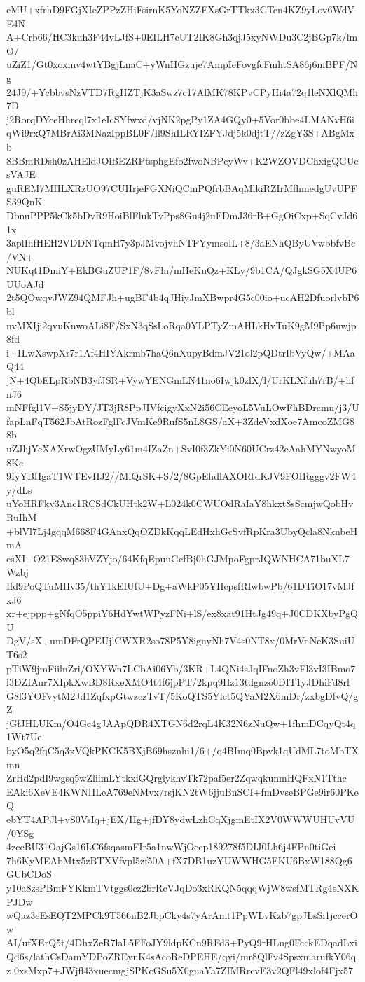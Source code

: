 cMU+xfrhD9FGjXIeZPPzZHiFsirnK5YoNZZFXsGrTTkx3CTen4KZ9yLov6WdVE4N
A+Crb66/HC3kuh3F44vLJfS+0EILH7cUT2IK8Gh3qjJ5xyNWDu3C2jBGp7k/lmO/
uZiZ1/Gt0xoxmv4wtYBgjLnaC+yWnHGzuje7AmpIeFovgfcFmhtSA86j6mBPF/Ng
24J9/+YcbbvsNzVTD7RgHZTjK3aSwz7c17AlMK78KPvCPyHi4a72q1leNXlQMh7D
j2RorqDYceHhreql7x1eIcSYfwxd/vjNK2pgPy1ZA4GQy0+5Vor0bbe4LMANvH6i
qWi9rxQ7MBrAi3MNazIppBL0F/ll9ShILRYIZFYJdj5k0djtT//zZgY3S+ABgMxb
8BBmRDsh0zAHEldJOlBEZRPtsphgEfo2fwoNBPcyWv+K2WZOVDChxigQGUesVAJE
guREM7MHLXRzUO97CUHrjeFGXNiQCmPQfrbBAqMlkiRZIrMfhmedgUvUPFS39QnK
DbnuPPP5kCk5bDvR9HoiBlFlukTvPps8Gu4j2uFDmJ36rB+GgOiCxp+SqCvJd61x
3aplIhfHEH2VDDNTqmH7y3pJMvojvhNTFYymsolL+8/3aENhQByUVwbbfvBc/VN+
NUKqt1DmiY+EkBGuZUP1F/8vFln/mHeKuQz+KLy/9b1CA/QJgkSG5X4UP6UUoAJd
2t5QOwqvJWZ94QMFJh+ugBF4b4qJHiyJmXBwpr4G5c00io+ucAH2DfuorlvbP6bl
nvMXIji2qvuKnwoALi8F/SxN3qSsLoRqa0YLPTyZmAHLkHvTuK9gM9Pp6uwjp8fd
i+1LwXswpXr7r1Af4HIYAkrmb7haQ6nXupyBdmJV21ol2pQDtrIbVyQw/+MAaQ44
jN+4QbELpRbNB3yfJSR+VywYENGmLN41no6Iwjk0zlX/l/UrKLXfuh7rB/+hfnJ6
mNFfgl1V+S5jyDY/JT3jR8PpJIVfcigyXxN2i56CEeyoL5VuLOwFhBDrcmu/j3/U
fapLnFqT562JbAtRozFglFcJVmKe9RufS5nL8GS/aX+3ZdeVxdXoe7AmcoZMG88b
uZJhjYcXAXrwOgzUMyLy61m4IZaZn+SvI0f3ZkYi0N60UCrz42cAahMYNwyoM8Kc
9IyYBHgaT1WTEvHJ2//MiQrSK+S/2/8GpEhdlAXORtdKJV9FOIRgggv2FW4y/dLs
uYoHRFkv3Anc1RCSdCkUHtk2W+L024k0CWUOdRaIaY8hkxt8sScmjwQobHvRuIhM
+blVl7Lj4gqqM668F4GAnxQqOZDkKqqLEdHxhGcSvfRpKra3UbyQcla8NknbeHmA
csXI+O21E8wq83hVZYjo/64KfqEpuuGcfBj0hGJMpoFgprJQWNHCA71buXL7Wzbj
Ifd9PoQTuMHv35/thY1kEIUfU+Dg+aWkP05YHcpsfRIwbwPb/61DTiO17vMJfxJ6
xr+ejppp+gNfqO5ppiY6HdYwtWPyzFNi+lS/ex8xat91HtJg49q+J0CDKXbyPgQU
DgV/sX+umDFrQPEUjlCWXR2so78P5Y8ignyNh7V4s0NT8x/0MrVnNeK3SuiUT6s2
pTiW9jmFiilnZri/OXYWn7LCbAi06Yb/3KR+L4QNi4sJqIFnoZh3vFl3vI3IBmo7
l3DZIAur7XIpkXwBD8RxeXMO4t4f6jpPT/2kpq9Hz13tdgnzo0DIT1yJDhiFd8rl
G8l3YOFvytM2Jd1ZqfxpGtwzczTvT/5KoQTS5Ylct5QYaM2X6mDr/zxbgDfvQ/gZ
jGfJHLUKm/O4Gc4gJAApQDR4XTGN6d2rqL4K32N6zNuQw+1fhmDCqyQt4q1Wt7Ue
byO5q2fqC5q3xVQkPKCK5BXjB69hsznhi1/6+/q4BImq0Bpvk1qUdML7toMbTXmn
ZrHd2pdI9wgsq5wZliimLYtkxiGQrglykhvTk72paf5er2ZqwqkunmHQFxN1Tthc
EAki6XeVE4KWNIILeA769eNMvx/rsjKN2tW6jjuBnSCI+fmDvseBPGe9ir60PKeQ
ebYT4APJl+vS0VsIq+jEX/IIg+jfDY8ydwLzhCqXjgmEtIX2V0WWWUHUvVU/0YSg
4zccBU31OajGs16LC6fsqasmFIr5a1nwWjOccp189278f5DIJ0Lh6j4FPn0tiGei
7h6KyMEAbMtx5zBTXVfvpl5zf50A+fX7DB1uzYUWWHG5FKU6BxW188Qg6GUbCDoS
y10a8zsPBmFYKkmTVtggs0cz2brRcVJqDo3xRKQN5qqqWjW8wsfMTRg4eNXKPJDw
wQaz3eEsEQT2MPCk9T566nB2JbpCky4s7yArAmt1PpWLvKzb7gpJLsSi1jccerOw
AI/ufXErQ5t/4DhxZeR7laL5FFoJY9ldpKCn9RFd3+PyQ9rHLng0FcckEDqadLxi
Qd6s/lathCsDamYDPoZREynK4sAcoReDPEHE/qyi/mr8QlFv4SpsxmarufkY06qz
0xsMxp7+JWjfl43xuecmgjSPKcGSu5X0guaYa7ZIMRrcvE3v2QFl49xlof4Fjx57
